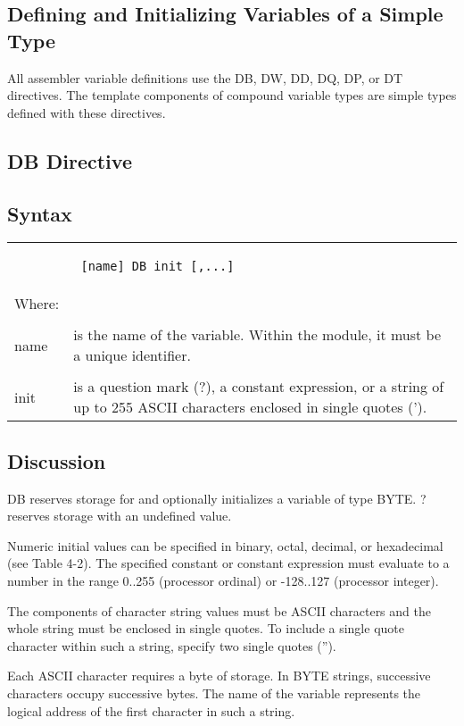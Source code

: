 \subsection*{Defining and Initializing Variables of a Simple Type}
All assembler variable definitions use the DB, DW, DD, DQ, DP, or DT directives. The template components of compound variable types are simple types defined with these directives.

\subsection*{DB Directive}
\subsection*{Syntax}
\begin{tabular}{p{2cm} p{12.5cm}}
& \begin{verbatim} [name] DB init [,...] \end{verbatim} \\
Where: & \\
& \\
name & is the name of the variable. Within the module, it must be a unique identifier. \\
& \\
init & is a question mark (?), a constant expression, or a string of up to 255 ASCII characters enclosed in single quotes (').\\
\end{tabular}
\subsection*{Discussion}
DB reserves storage for and optionally initializes a variable of type BYTE. ? reserves storage with an undefined value.

Numeric initial values can be specified in binary, octal, decimal, or hexadecimal (see Table 4-2). The specified constant or constant expression must evaluate to a number in the range 0..255 (processor ordinal) or -128..127 (processor integer).

The components of character string values must be ASCII characters and the whole string must be enclosed in single quotes. To include a single quote character within such a string, specify two single quotes ('').

Each ASCII character requires a byte of storage. In BYTE strings, successive characters occupy successive bytes. The name of the variable represents the logical address of the first character in such a string.

